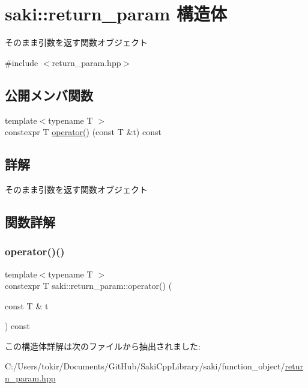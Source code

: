 \hypertarget{structsaki_1_1return__param}{}\section{saki\+:\+:return\+\_\+param 構造体}
\label{structsaki_1_1return__param}


そのまま引数を返す関数オブジェクト  




{\ttfamily \#include $<$return\+\_\+param.\+hpp$>$}

\subsection*{公開メンバ関数}
\begin{DoxyCompactItemize}
\item 
{\footnotesize template$<$typename T $>$ }\\constexpr T \mbox{\hyperlink{structsaki_1_1return__param_a5f46ee3ac78c1459267e3a39b30b31c3}{operator()}} (const T \&t) const
\end{DoxyCompactItemize}


\subsection{詳解}
そのまま引数を返す関数オブジェクト 

\subsection{関数詳解}
\mbox{\label{structsaki_1_1return__param_a5f46ee3ac78c1459267e3a39b30b31c3}} 
\subsubsection{\texorpdfstring{operator()()}{operator()()}}
{\footnotesize\ttfamily template$<$typename T $>$ \\
constexpr T saki\+::return\+\_\+param\+::operator() (\begin{DoxyParamCaption}\item[{const T \&}]{t }\end{DoxyParamCaption}) const\hspace{0.3cm}{\ttfamily [inline]}}



この構造体詳解は次のファイルから抽出されました\+:\begin{DoxyCompactItemize}
\item 
C\+:/\+Users/tokir/\+Documents/\+Git\+Hub/\+Saki\+Cpp\+Library/saki/function\+\_\+object/\mbox{\hyperlink{return__param_8hpp}{return\+\_\+param.\+hpp}}\end{DoxyCompactItemize}
